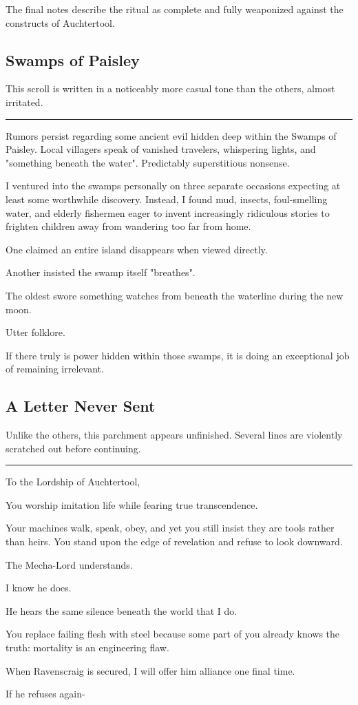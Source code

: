 The final notes describe the ritual as complete and fully weaponized against the constructs of Auchtertool.
\subsection*{Swamps of Paisley}
This scroll is written in a noticeably more casual tone than the others, almost irritated.

\noindent\rule{\linewidth}{0.6pt}

{\entryfont Rumors persist regarding some ancient evil hidden deep within the Swamps of Paisley. Local villagers speak of vanished travelers, whispering lights, and "something beneath the water". Predictably superstitious nonsense.

I ventured into the swamps personally on three separate occasions expecting at least some worthwhile discovery. Instead, I found mud, insects, foul-smelling water, and elderly fishermen eager to invent increasingly ridiculous stories to frighten children away from wandering too far from home.

One claimed an entire island disappears when viewed directly.

Another insisted the swamp itself "breathes".

The oldest swore something watches from beneath the waterline during the new moon.

Utter folklore.

If there truly is power hidden within those swamps, it is doing an exceptional job of remaining irrelevant.}
\vfill\eject
\subsection*{A Letter Never Sent}
Unlike the others, this parchment appears unfinished. Several lines are violently scratched out before continuing.

\noindent\rule{\linewidth}{0.6pt}

{\entryfont To the Lordship of Auchtertool,

You worship imitation life while fearing true transcendence.

Your machines walk, speak, obey, and yet you still insist they are tools rather than heirs. You stand upon the edge of revelation and refuse to look downward.

The Mecha-Lord understands.

I know he does.

He hears the same silence beneath the world that I do.

You replace failing flesh with steel because some part of you already knows the truth: mortality is an engineering flaw.

When Ravenscraig is secured, I will offer him alliance one final time.

If he refuses again-}

